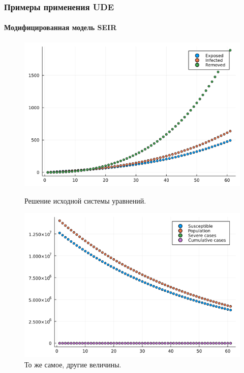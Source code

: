 \documentclass[10pt,pdf,hyperref={unicode}]{beamer}
\begin{document}
			\begin{frame}
				\frametitle{Примеры применения UDE} 
				\framesubtitle{Модифицированная модель SEIR}
				\begin{center}
					\begin{figure}[h!]
						\begin{minipage}{.4\textwidth}
							\includegraphics[width=\linewidth]{initial1.png}
							\caption{Решение исходной системы уравнений.}
							\centering
						\end{minipage}
						\begin{minipage}{.4\textwidth}
							\includegraphics[width=\linewidth]{initial2.png}
							\caption{То же самое, другие величины.}
							\centering
						\end{minipage}
						\centering
					\end{figure}
				\end{center}
			\end{frame}
		
\end{document}
